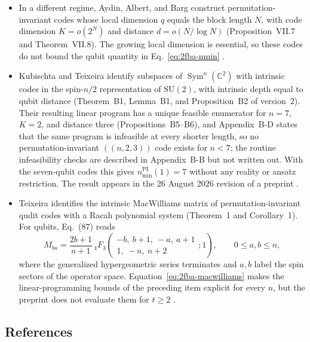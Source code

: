 \begin{itemize}
  \item In a different regime, Aydin, Albert, and Barg construct
  permutation-invariant codes whose local dimension $q$ equals the block length
  $N$, with code dimension $K=o(2^N)$ and distance $d=o(N/\log N)$
  (Proposition~VII.7 and Theorem~VII.8).  The growing local dimension is
  essential, so these codes do not bound the qubit quantity in
  Eq.~\eqref{eq:2fba-nmin} .

  \item Kubischta and Teixeira identify subspaces of $\operatorname{Sym}^n(\mathbb C^2)$
  with intrinsic codes in the spin-$n/2$ representation of $\mathrm{SU}(2)$,
  with intrinsic depth equal to qubit distance (Theorem~B1, Lemma~B1, and
  Proposition~B2 of version~2).  Their resulting linear program has a unique
  feasible enumerator for $n=7$, $K=2$, and distance three
  (Propositions~B5--B6), and Appendix~B-D states that the same program is
  infeasible at every shorter length, so no permutation-invariant $((n,2,3))$
  code exists for $n<7$; the routine infeasibility checks are described in
  Appendix~B-B but not written out.  With the seven-qubit codes this gives
  $n_{\min}^{\mathrm{PI}}(1)=7$ without any reality or ansatz restriction.  The
  result appears in the 26 August 2026 revision of a preprint
  .

  \item Teixeira identifies the intrinsic MacWilliams matrix of permutation-invariant
  qudit codes with a Racah polynomial system (Theorem~1 and Corollary~1).  For
  qubits, Eq.~(87) reads
  \begin{equation}
    M_{ba}=\frac{2b+1}{n+1}\,
    {}_4F_3\!\left(\begin{matrix}-b,\ b+1,\ -a,\ a+1\\ 1,\ -n,\ n+2\end{matrix};1\right),
    \qquad 0\leq a,b\leq n,
    \label{eq:2fba-macwilliams}
  \end{equation}
  where the generalized hypergeometric series terminates and $a,b$ label the
  spin sectors of the operator space.  Equation~\eqref{eq:2fba-macwilliams} makes
  the linear-programming bounds of the preceding item explicit for every $n$,
  but the preprint does not evaluate them for $t\geq2$
  .
\end{itemize}

\subsection*{References}

